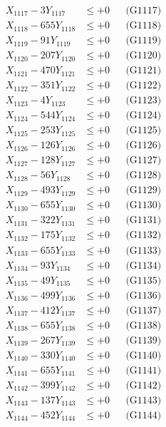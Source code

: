 \documentclass[a4paper,10pt]{article}
\begin{document}
{\begin{align}
X_{1117} - 3Y_{1117} &\leq +0 && \text{(G1117)} \\
X_{1118} - 655Y_{1118} &\leq +0 && \text{(G1118)} \\
X_{1119} - 91Y_{1119} &\leq +0 && \text{(G1119)} \\
X_{1120} - 207Y_{1120} &\leq +0 && \text{(G1120)} \\
\allowbreak
X_{1121} - 470Y_{1121} &\leq +0 && \text{(G1121)} \\
X_{1122} - 351Y_{1122} &\leq +0 && \text{(G1122)} \\
X_{1123} - 4Y_{1123} &\leq +0 && \text{(G1123)} \\
X_{1124} - 544Y_{1124} &\leq +0 && \text{(G1124)} \\
X_{1125} - 253Y_{1125} &\leq +0 && \text{(G1125)} \\
X_{1126} - 126Y_{1126} &\leq +0 && \text{(G1126)} \\
X_{1127} - 128Y_{1127} &\leq +0 && \text{(G1127)} \\
X_{1128} - 56Y_{1128} &\leq +0 && \text{(G1128)} \\
X_{1129} - 493Y_{1129} &\leq +0 && \text{(G1129)} \\
X_{1130} - 655Y_{1130} &\leq +0 && \text{(G1130)} \\
\allowbreak
X_{1131} - 322Y_{1131} &\leq +0 && \text{(G1131)} \\
X_{1132} - 175Y_{1132} &\leq +0 && \text{(G1132)} \\
X_{1133} - 655Y_{1133} &\leq +0 && \text{(G1133)} \\
X_{1134} - 93Y_{1134} &\leq +0 && \text{(G1134)} \\
X_{1135} - 49Y_{1135} &\leq +0 && \text{(G1135)} \\
X_{1136} - 499Y_{1136} &\leq +0 && \text{(G1136)} \\
X_{1137} - 412Y_{1137} &\leq +0 && \text{(G1137)} \\
X_{1138} - 655Y_{1138} &\leq +0 && \text{(G1138)} \\
X_{1139} - 267Y_{1139} &\leq +0 && \text{(G1139)} \\
X_{1140} - 330Y_{1140} &\leq +0 && \text{(G1140)} \\
\allowbreak
X_{1141} - 655Y_{1141} &\leq +0 && \text{(G1141)} \\
X_{1142} - 399Y_{1142} &\leq +0 && \text{(G1142)} \\
X_{1143} - 137Y_{1143} &\leq +0 && \text{(G1143)} \\
X_{1144} - 452Y_{1144} &\leq +0 && \text{(G1144)} \\

\end{align}}
\end{document}

